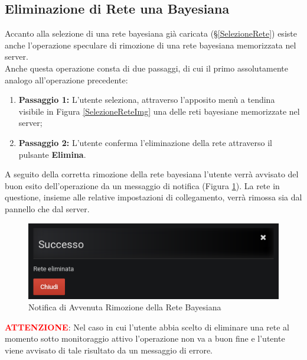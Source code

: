 \subsection{Eliminazione di Rete una Bayesiana}\label{EliminazioneRete}

Accanto alla selezione di una rete bayesiana già caricata (§\ref{SelezioneRete}) esiste anche l'operazione speculare di rimozione di una rete bayesiana memorizzata nel server.\\
Anche questa operazione consta di due passaggi, di cui il primo assolutamente analogo all'operazione precedente:
\begin{enumerate}
	\item \textbf{Passaggio 1:} L'utente seleziona, attraverso l'apposito menù a tendina visibile in Figura \ref{SelezioneReteImg} una delle reti bayesiane memorizzate nel server;
	\item \textbf{Passaggio 2:} L'utente conferma l'eliminazione della rete attraverso il pulsante \textbf{Elimina}.
\end{enumerate}

A seguito della corretta rimozione della rete bayesiana l'utente verrà avvisato del buon esito dell'operazione da un messaggio di notifica (Figura \ref{NotificaRimozioneRete}). La rete in questione, insieme alle relative impostazioni di collegamento, verrà rimossa sia dal pannello che dal server.

\begin{figure}[H]
	\begin{center}
		\includegraphics[scale=0.6]{./images/NotificaRimozioneRete.png}
		 \caption{Notifica di Avvenuta Rimozione della Rete Bayesiana}	
		 \label{NotificaRimozioneRete}
	\end{center}
\end{figure}

\textbf{\textcolor{red}{ATTENZIONE}}: Nel caso in cui l'utente abbia scelto di eliminare una rete al momento sotto monitoraggio attivo l'operazione non va a buon fine e l'utente viene avvisato di tale risultato da un messaggio di errore.
